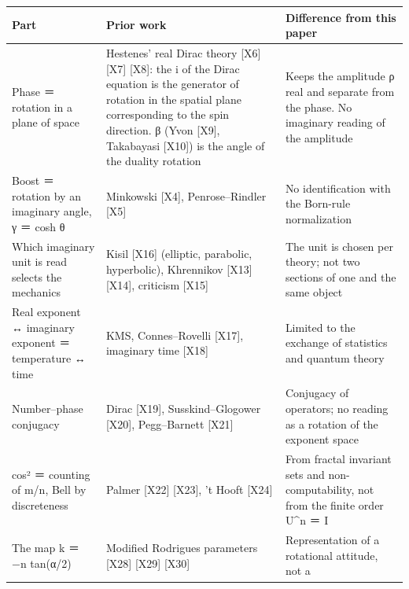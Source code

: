 \documentclass[
  a4paper,
]{article}
\newcounter{none} %
\begin{document}
{\def\LTcaptype{none} %
\begin{longtable}[]{@{}
  >{\raggedright\arraybackslash}p{}
  >{\raggedright\arraybackslash}p{}
  >{\raggedright\arraybackslash}p{}@{}}
\toprule\noalign{}
\begin{minipage}[b]{\linewidth}\raggedright
Part
\end{minipage} & \begin{minipage}[b]{\linewidth}\raggedright
Prior work
\end{minipage} & \begin{minipage}[b]{\linewidth}\raggedright
Difference from this paper
\end{minipage} \\
\midrule\noalign{}
\endhead
\bottomrule\noalign{}
\endlastfoot
Phase ＝ rotation in a plane of space & Hestenes' real Dirac theory
{[}X6{]} {[}X7{]} {[}X8{]}: the i of the Dirac equation is the generator
of rotation in the spatial plane corresponding to the spin direction. β
(Yvon {[}X9{]}, Takabayasi {[}X10{]}) is the angle of the duality
rotation & Keeps the amplitude ρ real and separate from the phase. No
imaginary reading of the amplitude \\
Boost ＝ rotation by an imaginary angle, γ ＝ cosh θ & Minkowski
{[}X4{]}, Penrose--Rindler {[}X5{]} & No identification with the
Born-rule normalization \\
Which imaginary unit is read selects the mechanics & Kisil {[}X16{]}
(elliptic, parabolic, hyperbolic), Khrennikov {[}X13{]} {[}X14{]},
criticism {[}X15{]} & The unit is chosen per theory; not two sections of
one and the same object \\
Real exponent ↔ imaginary exponent ＝ temperature ↔ time & KMS,
Connes--Rovelli {[}X17{]}, imaginary time {[}X18{]} & Limited to the
exchange of statistics and quantum theory \\
Number--phase conjugacy & Dirac {[}X19{]}, Susskind--Glogower {[}X20{]},
Pegg--Barnett {[}X21{]} & Conjugacy of operators; no reading as a
rotation of the exponent space \\
cos² ＝ counting of m/n, Bell by discreteness & Palmer {[}X22{]}
{[}X23{]}, 't Hooft {[}X24{]} & From fractal invariant sets and
non-computability, not from the finite order U\^{}n ＝ I \\
The map k ＝ −n tan(α/2) & Modified Rodrigues parameters {[}X28{]}
{[}X29{]} {[}X30{]} & Representation of a rotational attitude, not a

\end{longtable}}
\end{document}

